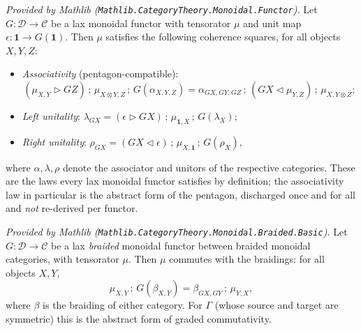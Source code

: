 \begin{lemma}
  \label{lem:laxMonoidal_coherence_mathlib}
  \mathlibok
  \textit{Provided by Mathlib (\texttt{Mathlib.CategoryTheory.Monoidal.Functor}).}
  Let \(G : \mathcal{D} \to \mathcal{C}\) be a lax monoidal functor with tensorator
  \(\mu\) and unit map \(\epsilon : \mathbf{1} \to G(\mathbf{1})\). Then \(\mu\)
  satisfies the following coherence squares, for all objects \(X, Y, Z\):
  \begin{itemize}
    \item \emph{Associativity} (pentagon-compatible):
      \[
        (\mu_{X,Y} \rhd G Z) \,;\, \mu_{X \otimes Y, Z} \,;\, G(\alpha_{X,Y,Z})
          = \alpha_{GX,GY,GZ} \,;\, (G X \lhd \mu_{Y,Z}) \,;\, \mu_{X, Y \otimes Z};
      \]
    \item \emph{Left unitality}:
      \(\lambda_{GX} = (\epsilon \rhd G X) \,;\, \mu_{\mathbf{1}, X} \,;\,
        G(\lambda_X)\);
    \item \emph{Right unitality}:
      \(\rho_{GX} = (G X \lhd \epsilon) \,;\, \mu_{X, \mathbf{1}} \,;\,
        G(\rho_X)\),
  \end{itemize}
  where \(\alpha, \lambda, \rho\) denote the associator and unitors of the
  respective categories. These are the laws every lax monoidal functor satisfies
  by definition; the associativity law in particular is the abstract form of the
  pentagon, discharged once and for all and \emph{not} re-derived per functor.
\end{lemma}

\begin{lemma}
  \label{lem:laxBraided_braided_mathlib}
  \mathlibok
  \textit{Provided by Mathlib (\texttt{Mathlib.CategoryTheory.Monoidal.Braided.Basic}).}
  Let \(G : \mathcal{D} \to \mathcal{C}\) be a lax \emph{braided} monoidal functor
  between braided monoidal categories, with tensorator \(\mu\). Then \(\mu\)
  commutes with the braidings: for all objects \(X, Y\),
  \[
    \mu_{X,Y} \,;\, G(\beta_{X,Y}) = \beta_{GX,GY} \,;\, \mu_{Y,X},
  \]
  where \(\beta\) is the braiding of either category. For \(\Gamma\) (whose source
  and target are symmetric) this is the abstract form of graded commutativity.
\end{lemma}

